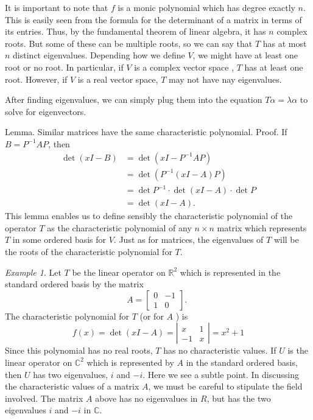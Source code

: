 \documentclass{book}
\theoremstyle{remark}
\newtheorem{example}{Example}[section]
\theoremstyle{definition}
\begin{document}
It is important to note that $f$ is a monic polynomial which has degree exactly $n$. This is easily seen from the formula for the determinant of a matrix in terms of its entries. Thus, by the fundamental theorem of linear algebra, it has $n$ complex roots. But some of these can be multiple roots, so we can say that $T$ has at most $n$ distinct eigenvalues. Depending how we define $V$, we might have at least one root or no root. In particular, if $V$ is a complex vector space , $T$ has at least one root. However, if $V$ is a real vector space, $T$ may not have nay eigenvalues. 

After finding eigenvalues, we can simply plug them into the equation $T\alpha = \lambda \alpha$ to solve for eigenvectors. 

Lemma. Similar matrices have the same characteristic polynomial. Proof. If $B=P^{-1} A P$, then
$$
\begin{aligned}
\operatorname{det}(x I-B) & =\operatorname{det}\left(x I-P^{-1} A P\right) \\
& =\operatorname{det}\left(P^{-1}(x I-A) P\right) \\
& =\operatorname{det} P^{-1} \cdot \operatorname{det}(x I-A) \cdot \operatorname{det} P \\
& =\operatorname{det}(x I-A) .
\end{aligned}
$$
This lemma enables us to define sensibly the characteristic polynomial of the operator $T$ as the characteristic polynomial of any $n \times n$ matrix which represents $T$ in some ordered basis for $V$. Just as for matrices, the eigenvalues of $T$ will be the roots of the characteristic polynomial for $T$. 

\begin{example}
    
Let $T$ be the linear operator on $\mathbb{R}^2$ which is represented in the standard ordered basis by the matrix
$$
A=\left[\begin{array}{rr}
0 & -1 \\
1 & 0
\end{array}\right] \text {. }
$$
The characteristic polynomial for $T$ (or for $A$ ) is
$$
f(x) = \operatorname{det}(x I-A)=\left|\begin{array}{rr}
x & 1 \\
-1 & x
\end{array}\right|=x^2+1
$$
Since this polynomial has no real roots, $T$ has no characteristic values. If $U$ is the linear operator on $\mathbb{C}^2$ which is represented by $A$ in the standard ordered basis, then $U$ has two eigenvalues, $i$ and $-i$. Here we see a subtle point. In discussing the characteristic values of a matrix $A$, we must be careful to stipulate the field involved. The matrix $A$ above has no eigenvalues in $R$, but has the two eigenvalues $i$ and $-i$ in $\mathbb{C}$.
\end{example} 
\end{document}
